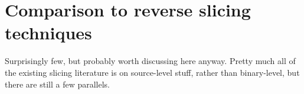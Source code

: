 
\section{Comparison to reverse slicing techniques}
Surprisingly few, but probably worth discussing here anyway.
Pretty much all of the existing slicing literature is on source-level stuff, rather than binary-level, but there are still a few parallels.

